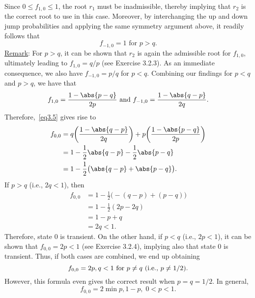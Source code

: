 \begin{Example}
    Since $ 0\le f_{1,0}\le 1 $, the root $ r_1 $ must be inadmissible,
    thereby implying that $ r_2 $ is the correct root to use in this case.
    Moreover, by interchanging the up and down jump probabilities and applying
    the same symmetry argument above, it readily follows that
    \[ f_{-1,0}=1\text{ for $p>q$}. \]
    \underline{Remark}: For $ p>q $, it can be shown that $ r_2 $
    is again the admissible root for $ f_{1,0} $, ultimately leading to
    $ f_{1,0}=q/p $ (see Exercise 3.2.3). As an immediate consequence,
    we also have $ f_{-1,0}=p/q $ for $ p<q $.
    Combining our findings for $ p<q $ and $ p>q $, we have that
    \[ f_{1,0}=\frac{1-\abs{p-q}}{2p} \text{ and }f_{-1,0}=\frac{1-\abs{q-p}}{2q}. \]
    Therefore,~\ref{eq3.5} gives rise to
    \begin{align*}
        f_{0,0}
         & =q\biggl(\frac{1-\abs{q-p}}{2q} \biggr)+p\biggl(\frac{1-\abs{p-q}}{2p} \biggr) \\
         & =1-\frac{1}{2} \abs{q-p}-\frac{1}{2} \abs{p-q}                                 \\
         & =1-\frac{1}{2} \bigl(\abs{q-p}+\abs{p-q}\bigr).
    \end{align*}
    If $ p>q $ (i.e., $ 2q<1 $), then
    \begin{align*}
        f_{0,0}
         & =1-\frac{1}{2} \bigl(-(q-p)+(p-q)\bigr) \\
         & =1-\frac{1}{2}(2p-2q)                   \\
         & =1-p+q                                  \\
         & =2q<1.\label{eq3.7}\tag*{(3.7)}
    \end{align*}
    Therefore, state $ 0 $ is transient. On the other hand, if $ p<q $ (i.e., $ 2p<1 $),
    it can be shown that $ f_{0,0}=2p<1 $ (see Exercise 3.2.4), implying also
    that state $ 0 $ is transient. Thus, if both cases are combined, we end up
    obtaining
    \[ f_{0,0}=2\min{p,q}<1\text{ for $ p\ne q $ (i.e., $ p\ne 1/2 $)}. \]
    However, this formula even gives the correct result
    when $ p=q=1/2 $. In general,
    \[ f_{0,0}=2\min{p,1-p},\; 0<p<1. \]
\end{Example}
